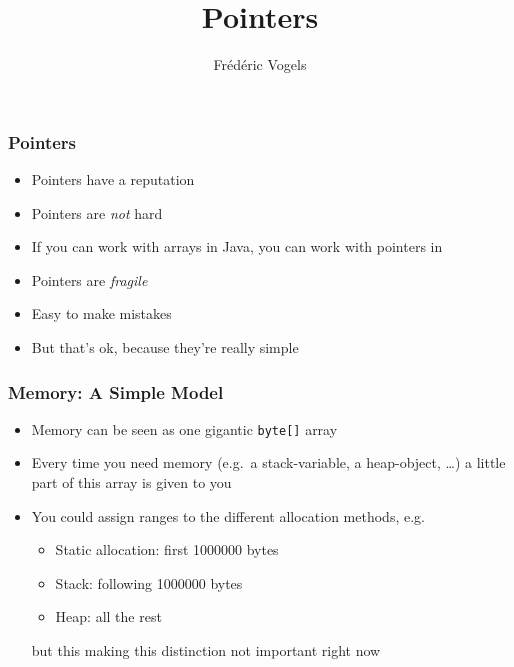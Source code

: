 \documentclass{../ucll-slides}
\title{Pointers}
\author{Fr\'ed\'eric Vogels}
\begin{document}
\begin{frame}
  \titlepage
\end{frame}

\begin{frame}
  \frametitle{Pointers}
  \begin{itemize}
    \item Pointers have a reputation
    \item Pointers are \emph{not} hard
    \item If you can work with arrays in Java, you can work with pointers in \cpp
    \item Pointers are \emph{fragile}
    \item Easy to make mistakes
    \item But that's ok, because they're really simple
  \end{itemize}
\end{frame}

\begin{frame}
  \frametitle{Memory: A Simple Model}
  \begin{itemize}
    \item Memory can be seen as one gigantic {\tt byte[]} array
    \item Every time you need memory (e.g.\ a stack-variable, a heap-object, \dots)
          a little part of this array is given to you
    \item You could assign ranges to the different allocation methods, e.g.
          \begin{itemize}
            \item Static allocation: first 1000000 bytes
            \item Stack: following 1000000 bytes
            \item Heap: all the rest
          \end{itemize}
          but this making this distinction not important right now
  \end{itemize}
\end{frame}
\end{document}
